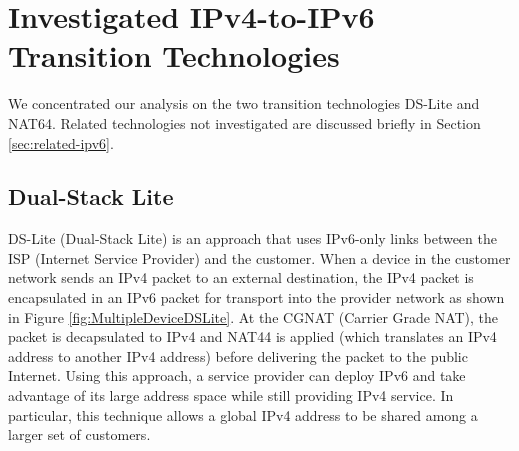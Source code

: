 \documentclass{llncs}
\begin{document}
\section{Investigated IPv4-to-IPv6 Transition Technologies}
\label{sec:technology}

We concentrated our analysis on the two transition technologies DS-Lite and NAT64. Related technologies not investigated are discussed briefly in Section \ref{sec:related-ipv6}.

\subsection{Dual-Stack Lite}
\label{sec:ds-lite}
DS-Lite (Dual-Stack Lite) \cite{DSLITE} is an approach that uses IPv6-only links between the ISP (Internet Service Provider) and the customer. When a device in the customer network sends an IPv4 packet to an external destination, the IPv4 packet is encapsulated in an IPv6 packet for transport into the provider network as shown in Figure \ref{fig:MultipleDeviceDSLite}. At the CGNAT (Carrier Grade NAT), the packet is decapsulated to IPv4 and NAT44 is applied (which translates an IPv4 address to another IPv4 address) before delivering the packet to the public Internet. Using this approach, a service provider can deploy IPv6 and take advantage of its large address space while still providing IPv4 service. In particular, this technique allows a global IPv4 address to be shared among a larger set of customers. 
\end{document}
